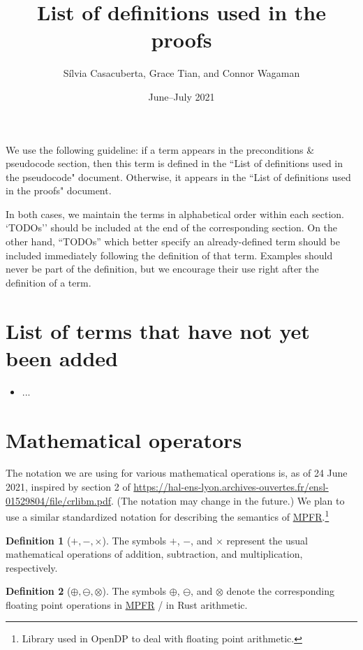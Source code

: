 \documentclass[11pt,a4paper]{article}
\title{List of definitions used in the proofs}
\author{S\'ilvia Casacuberta, Grace Tian, and Connor Wagaman}
\date{June--July 2021}
\theoremstyle{definition}
\newtheorem{definition}{Definition}[section]
\newcommand{\silvia}[1]{{ {\color{blue}{(silvia)~#1}}}}
\begin{document}
\maketitle

We use the following guideline: if a term appears in the preconditions \& pseudocode section, then this term is defined in the ``List of definitions used in the pseudocode" document. Otherwise, it appears in the ``List of definitions used in the proofs" document. 

In both cases, we maintain the terms in alphabetical order within each section. `TODOs'' should be included at the end of the corresponding section. On the other hand, ``TODOs'' which better specify an already-defined term should be included immediately following the definition of that term. Examples should never be part of the definition, but we encourage their use right after the definition of a term.

\tableofcontents

\section*{List of terms that have not yet been added}
\begin{itemize}
\item ...
\end{itemize}

\section{Mathematical operators}
\silvia{Passed form the list of definitions used in the pseudocode doc. Merge with ``Operations" section.}

The notation we are using for various mathematical operations is, as of 24 June 2021, inspired by section 2 of \url{https://hal-ens-lyon.archives-ouvertes.fr/ensl-01529804/file/crlibm.pdf}. (The notation may change in the future.) We plan to use a similar standardized notation for describing the semantics of \href{https://www.mpfr.org/}{MPFR}.\footnote{Library used in OpenDP to deal with floating point arithmetic.}

\begin{definition}[$+, -, \times$]
    The symbols $+$, $-$, and $\times$ represent the usual mathematical operations of addition, subtraction, and multiplication, respectively.
\end{definition}

\begin{definition}[$\oplus, \ominus, \otimes$]
    The symbols $\oplus$, $\ominus$, and $\otimes$ denote the corresponding floating point operations in \href{https://www.mpfr.org/}{MPFR} / in Rust arithmetic. 
\end{definition}
\end{document}
